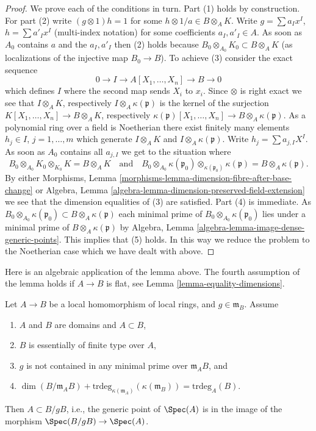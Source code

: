 \begin{proof}
\medskip\noindent
We prove each of the conditions in turn. Part (1) holds by construction.
For part (2) write $(g \otimes 1) h = 1$ for some
$h \otimes 1/a \in B \otimes_A K$. Write
$g = \sum a_I x^I$, $h = \sum a'_I x^I$ (multi-index notation)
for some coefficients $a_I, a'_I \in A$. As soon as $A_0$ contains
$a$ and the $a_I, a'_I$ then (2) holds because
$B_0 \otimes_{A_0} K_0 \subset B \otimes_A K$ (as localizations of the
injective map $B_0 \to B$).
To achieve (3) consider the exact sequence
$$
0 \to I \to A[X_1, \ldots, X_n] \to B \to 0
$$
which defines $I$ where the second map sends $X_i$ to $x_i$. Since $\otimes$
is right exact we see that $I \otimes_A K$, respectively
$I \otimes_A \kappa(\mathfrak p)$ is the kernel of the surjection
$K[X_1, \ldots, X_n] \to B \otimes_A K$, respectively
$\kappa(\mathfrak p)[X_1, \ldots, X_n] \to B \otimes_A \kappa(\mathfrak p)$.
As a polynomial ring over a field is Noetherian
there exist finitely many elements $h_j \in I$, $j = 1, \ldots, m$
which generate $I \otimes_A K$ and $I \otimes_A \kappa(\mathfrak p)$.
Write $h_j = \sum a_{j, I}X^I$. As soon as
$A_0$ contains all $a_{j, I}$ we get to the situation where
$$
B_0 \otimes_{A_0} K_0 \otimes_{K_0} K = B \otimes_A K
\quad\text{and}\quad
B_0 \otimes_{A_0} \kappa(\mathfrak p_0)
\otimes_{\kappa(\mathfrak p_0)} \kappa(\mathfrak p)
=
B \otimes_A \kappa(\mathfrak p).
$$
By either
Morphisms, Lemma \ref{morphisms-lemma-dimension-fibre-after-base-change}
or
Algebra, Lemma \ref{algebra-lemma-dimension-preserved-field-extension}
we see that the dimension equalities of (3) are satisfied.
Part (4) is immediate. As
$B_0 \otimes_{A_0} \kappa(\mathfrak p_0) \subset
B \otimes_A \kappa(\mathfrak p)$ each minimal prime of
$B_0 \otimes_{A_0} \kappa(\mathfrak p_0)$ lies under a minimal
prime of $B \otimes_A \kappa(\mathfrak p)$ by
Algebra, Lemma \ref{algebra-lemma-image-dense-generic-points}.
This implies that (5) holds.
In this way we reduce the problem to the Noetherian case which we
have dealt with above.
\end{proof}

\noindent
Here is an algebraic application of the lemma above.
The fourth assumption of the lemma holds if $A \to B$ is flat, see
Lemma \ref{lemma-equality-dimensions}.

\begin{lemma}
\label{lemma-horizontal}
Let $A \to B$ be a local homomorphism of local rings, and
$g \in \mathfrak m_B$. Assume
\begin{enumerate}
\item $A$ and $B$ are domains and $A \subset B$,
\item $B$ is essentially of finite type over $A$,
\item $g$ is not contained in any minimal prime over $\mathfrak m_AB$, and
\item $\dim(B/\mathfrak m_AB) +
\text{trdeg}_{\kappa(\mathfrak m_A)}(\kappa(\mathfrak m_B)) =
\text{trdeg}_A(B)$.
\end{enumerate}
Then $A \subset B/gB$, i.e., the generic point of $\Spec(A)$
is in the image of the morphism $\Spec(B/gB) \to \Spec(A)$.
\end{lemma}

